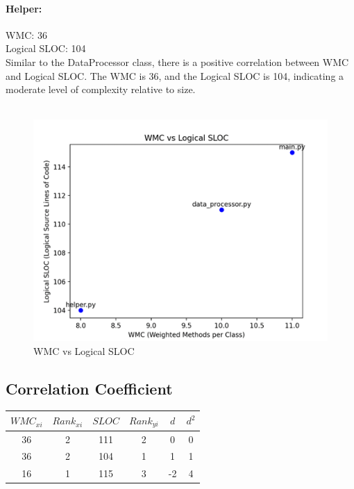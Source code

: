 \documentclass[runningheads]{llncs}
\begin{document}
\paragraph{Helper:\\}
WMC: 36 \\
Logical SLOC: 104 \\
Similar to the DataProcessor class, there is a positive correlation between WMC and Logical SLOC. The WMC is 36, and the Logical SLOC is 104, indicating a moderate level of complexity relative to size.\\ \\

\begin{figure}[h]
  \centering
  \includegraphics[width=14cm]{SP.png}
  \caption{WMC vs Logical SLOC}
\end{figure}

\newpage
\subsection{Correlation Coefficient}

\begin{center}
\begin{tabular}{ |c|c|c|c|c|c|}
\hline
$WMC_{xi}$ & $Rank_{xi}$ & $SLOC$ & $Rank_{yi}$ & $d$ & $d^2$ \\ 
\hline
36 & 2 & 111 & 2 & 0 & 0\\  
\hline
36 & 2 & 104 & 1 & 1 & 1\\
\hline
16 & 1 & 115 & 3 & -2 & 4\\
\hline
\end{tabular}\\
\end{center}
\end{document}
